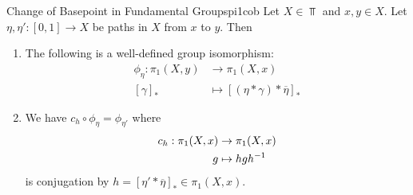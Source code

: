 \begin{theorem}{Change of Basepoint in Fundamental Groups}{pi1cob}
  Let $X\in\Top$ and $x,y\in X$. Let $\eta,\eta':[0,1]\to X$ be paths in $X$ from $x$ to $y$. Then \begin{enumerate}
    \item The following is a well-defined group isomorphism: \begin{align*}
      \phi_\eta:\pi_1(X,y)&\to\pi_1(X,x) \\
                [\gamma]_*&\mapsto[(\eta\ast\gamma)\ast\overline{\eta}]_*
    \end{align*}
    \item We have $c_h\circ\phi_\eta=\phi_{\eta'}$ where \begin{align*}
      c_h:\pi_1(X,x)&\to\pi_1(X,x)\\ g&\mapsto hgh^{-1}
    \end{align*}
    is conjugation by $h=[\eta'\ast\overline{\eta}]_*\in\pi_1(X,x)$.
  \end{enumerate}
\end{theorem}

